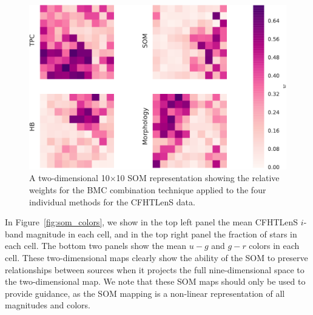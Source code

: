 \documentclass[useAMS,usenatbib]{mn2e}
\begin{document}
\begin{figure}
  \centering
  \includegraphics[width=\columnwidth]{figures/weights.pdf}
  \caption{A two-dimensional 10$\times$10 SOM representation
           showing the relative weights for the BMC combination technique
           applied to the four individual methods for the CFHTLenS data.}
  \label{fig:weights}
\end{figure}

In Figure~\ref{fig:som_colors}, we show in the top left panel
the mean CFHTLenS $i$-band magnitude in each cell,
and in the top right panel the fraction of stars in each cell.
The bottom two panels show the mean $u-g$ and  $g-r$ colors in each cell.
These two-dimensional maps clearly show
the ability of the SOM to preserve relationships between sources
when it projects the full nine-dimensional space to the two-dimensional map.
We note that these SOM maps should only be used to provide guidance,
as the SOM mapping is a non-linear representation of all magnitudes and colors.
\end{document}
